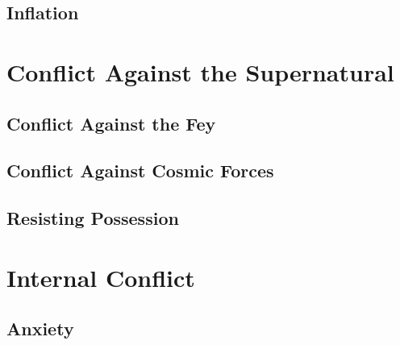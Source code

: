 \documentclass[twocolumn]{dndbook}
\begin{document}
\section{Inflation}



\chapter{Conflict Against the Supernatural}
\section{Conflict Against the Fey}

\section{Conflict Against Cosmic Forces}

\section{Resisting Possession}



\chapter{Internal Conflict}
\section{Anxiety}
\end{document}
